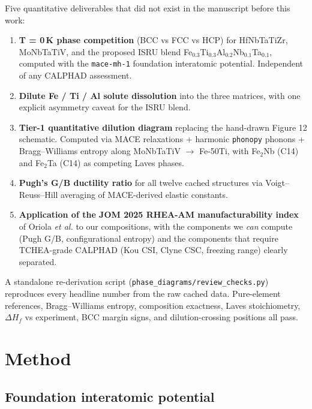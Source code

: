 \documentclass[11pt,a4paper]{article}
\begin{document}
Five quantitative deliverables that did not exist in the manuscript before
this work:

\begin{enumerate}[1.]
  \item \textbf{T = 0\,K phase competition} (BCC vs FCC vs HCP) for HfNbTaTiZr,
        MoNbTaTiV, and the proposed ISRU blend
        Fe$_{0.3}$Ti$_{0.3}$Al$_{0.2}$Nb$_{0.1}$Ta$_{0.1}$, computed with the
        \texttt{mace-mh-1} foundation interatomic potential. Independent of any
        CALPHAD assessment.
  \item \textbf{Dilute Fe / Ti / Al solute dissolution} into the three matrices,
        with one explicit asymmetry caveat for the ISRU blend.
  \item \textbf{Tier-1 quantitative dilution diagram} replacing the hand-drawn
        Figure 12 schematic. Computed via MACE relaxations + harmonic
        \texttt{phonopy} phonons + Bragg--Williams entropy along
        MoNbTaTiV $\rightarrow$ Fe-50Ti, with Fe$_2$Nb (C14) and Fe$_2$Ta (C14)
        as competing Laves phases.
  \item \textbf{Pugh's G/B ductility ratio} for all twelve cached structures
        via Voigt--Reuss--Hill averaging of MACE-derived elastic constants.
  \item \textbf{Application of the JOM 2025 RHEA-AM manufacturability index}
        of Oriola \emph{et al.} to our compositions, with the components we
        \emph{can} compute (Pugh G/B, configurational entropy) and the
        components that require TCHEA-grade CALPHAD (Kou CSI, Clyne CSC,
        freezing range) clearly separated.
\end{enumerate}

\begin{okbox}[title=All numerical claims verified]
A standalone re-derivation script
(\texttt{phase\_diagrams/review\_checks.py}) reproduces every headline number
from the raw cached data. Pure-element references, Bragg--Williams entropy,
composition exactness, Laves stoichiometry, $\Delta H_f$ vs experiment, BCC
margin signs, and dilution-crossing positions all pass.
\end{okbox}

\section{Method}
\label{sec:method}

\subsection{Foundation interatomic potential}
\end{document}
